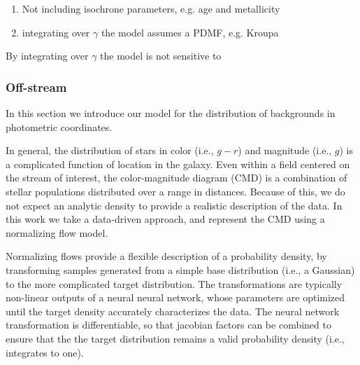 \documentclass[twocolumn]{aastex631}
\begin{document}
            \begin{enumerate}
                \item Not including isochrone parameters, e.g. age and metallicity
                \item integrating over $\gamma$ the model assumes a PDMF, e.g. Kroupa
            \end{enumerate}

            By integrating over $\gamma$ the model is not sensitive to 

    
        \subsubsection{Off-stream} \label{sub:photometric_model_off_stream}
            In this section we introduce our model for the distribution of backgrounds in photometric coordinates. 

            In general, the distribution of stars in color (i.e., $g-r$) and magnitude (i.e., $g$) is a complicated function of location in the galaxy. Even within a field centered on the stream of interest, the color-magnitude diagram (CMD) is a combination of stellar populations distributed over a range in distances. Because of this, we do not expect an analytic density to provide a realistic description of the data. In this work we take a data-driven approach, and represent the CMD using a normalizing flow model.

            Normalizing flows provide a flexible description of a probability density, by transforming samples generated from a simple base distribution (i.e., a Gaussian) to the more complicated target distribution. The transformations are typically non-linear outputs of a neural neural network, whose parameters are optimized until the target density accurately characterizes the data. The neural network transformation is differentiable, so that jacobian factors can be combined to ensure that the the target distribution remains a valid probability density (i.e., integrates to one).  
\end{document}
